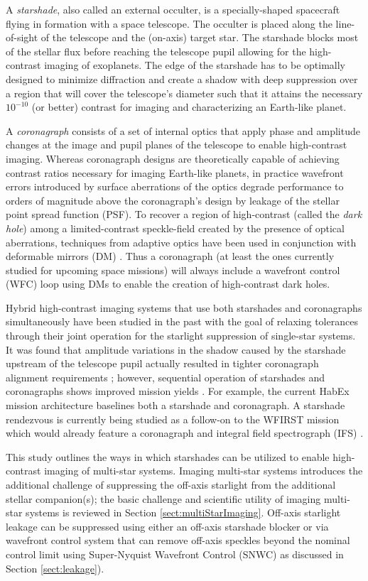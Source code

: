 \documentclass[]{spie}  %
\begin{document}
A \emph{starshade}, also called an external occulter, is a specially-shaped spacecraft flying in formation with a space telescope. The occulter is placed along the line-of-sight of the telescope and the (on-axis) target star. The starshade blocks most of the stellar flux before reaching the telescope pupil allowing for the high-contrast imaging of exoplanets. The edge of the starshade  has to be optimally designed to minimize diffraction and create a shadow with deep suppression over a region that will cover the telescope's diameter such that it attains the necessary $10^{-10}$ (or better) contrast for imaging and characterizing an Earth-like planet. 

A \emph{coronagraph} consists of a set of internal optics that apply phase and amplitude changes at the image and pupil planes of the telescope to enable high-contrast imaging. Whereas coronagraph designs are theoretically capable of achieving contrast ratios necessary for imaging Earth-like planets, in practice wavefront errors introduced by surface aberrations of the optics degrade performance to orders of magnitude above
the coronagraph's design by leakage of the stellar point spread function (PSF). To recover a region of high-contrast (called the \emph{dark hole}) among a limited-contrast speckle-field created by the presence of optical aberrations, techniques from adaptive optics have been used in conjunction with deformable mirrors (DM) \cite{Malbet95}. Thus a coronagraph (at least the ones currently studied for upcoming space missions) will always include a wavefront control (WFC) loop using DMs to enable the creation of high-contrast dark holes.

Hybrid high-contrast imaging systems that use both starshades and coronagraphs simultaneously have been studied in the past with the goal of relaxing tolerances through their joint operation for the starlight suppression of single-star systems. It was found that amplitude variations in the shadow caused by the starshade upstream of the telescope pupil actually resulted in tighter coronagraph alignment requirements \cite{Cady08}; however, sequential operation of starshades and coronagraphs shows improved mission yields \cite{Stark16}. For example, the current HabEx mission architecture baselines both a starshade and coronagraph. A starshade rendezvous is currently being studied as a follow-on to the WFIRST mission which would already feature a coronagraph and integral field spectrograph (IFS) \cite{Mandell17}.

This study outlines the ways in which starshades can be utilized to enable high-contrast imaging of multi-star systems. Imaging multi-star systems introduces the additional challenge of suppressing the off-axis starlight from the additional stellar companion(s); the basic challenge and scientific utility of imaging multi-star systems is reviewed in Section \ref{sect:multiStarImaging}. Off-axis starlight leakage can be suppressed using either an off-axis starshade blocker or via wavefront control system that can remove off-axis speckles beyond the nominal control limit using Super-Nyquist Wavefront Control (SNWC) \cite{Thomas15} as discussed in Section \ref{sect:leakage}).
\end{document}
